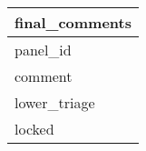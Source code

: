 \documentclass{article}
\begin{document}

\begin{tabular}{|l|} \hline
\textbf{final\_comments} \\ \hline
panel\_id \\ \hline
comment \\ \hline
lower\_triage \\ \hline
locked \\ \hline
\end{tabular}
\end{document}
